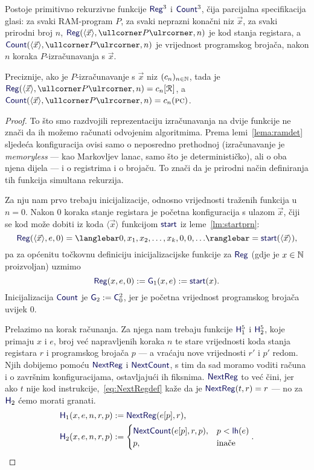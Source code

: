 \begin{lema}[{name=[primitivna rekurzivnost RAM-izračunavanja]}]\label{lm:RegCountprn}
Postoje primitivno rekurzivne funkcije $\f{Reg}^3$ i $\f{Count}^3$, čija parcijalna specifikacija glasi:
za svaki RAM-program $P$, za svaki neprazni konačni niz $\vec x$, za svaki prirodni broj $n$, $\f{Reg}(\langle \vec x\rangle,\kprog{P},n)$ je kod stanja registara, a $\f{Count}(\langle \vec x\rangle,\kprog{P},n)$ je vrijednost programskog brojača, nakon $n$ koraka $P$-izračunavanja s $\vec x$.
\end{lema}
Preciznije, ako je $P$-izračunavanje s $\vec x$ niz $(c_n)_{n\in{\mathbb N}}$, tada je $\f{Reg}(\langle\vec x\rangle, \kprog{P},n)=c_n[\reg{}]$, a $\f{Count}(\langle\vec x\rangle,\kprog{P},n)=c_n(\textsc{pc})$.
\begin{proof}
    To što smo razdvojili reprezentaciju izračunavanja na dvije funkcije ne znači da ih možemo računati odvojenim algoritmima. Prema lemi~\ref{lema:ramdet} sljedeća konfiguracija ovisi samo o neposredno prethodnoj (izračunavanje je \emph{memoryless} --- kao Markovljev lanac, samo što je determinističko), ali o oba njena dijela --- i o registrima i o brojaču. To znači da je prirodni način definiranja tih funkcija simultana rekurzija.

Za nju nam prvo trebaju inicijalizacije, odnosno vrijednosti traženih funkcija u $n=0$. Nakon $0$ koraka stanje registara je početna konfiguracija s ulazom $\vec x$, čiji se kod može dobiti iz koda $\langle\vec x\rangle$ funkcijom $\f{start}$ iz leme~\ref{lm:startprn}:
\begin{equation}
    \f{Reg}(\langle\vec x\rangle,e,0)=\knk{0,x_1,x_2,\dotsc,x_k,0,0,\dotsc}=\f{start}(\langle\vec x\rangle)\text,
\end{equation}
pa za općenitu točkovnu definiciju inicijalizacijske funkcije za $\f{Reg}$ (gdje je $x\in{\mathbb N}$ proizvoljan) uzmimo
\begin{equation}
    \f{Reg}(x,e,0):=\f G_1(x,e):=\f{start}(x)\text.
\end{equation}
Inicijalizacija $\f{Count}$ je $\f G_2:=\f C_0^2$, jer je početna vrijednost programskog brojača uvijek $0$.

Prelazimo na korak računanja. Za njega nam trebaju funkcije $\f H_1^5$ i $\f H_2^5$, koje primaju $x$ i $e$, broj već napravljenih koraka $n$ te stare vrijednosti koda stanja registara $r$ i programskog brojača $p$ --- a vraćaju nove vrijednosti $r'$ i $p'$ redom. Njih dobijemo pomoću $\f{NextReg}$ i $\f{NextCount}$, s tim da sad moramo voditi računa i o završnim konfiguracijama, ostavljajući ih fiksnima. $\f{NextReg}$ to već čini, jer ako $t$ nije kod instrukcije,~\eqref{eq:NextRegdef} kaže da je $\f{NextReg}(t,r)=r$ --- no za $\f H_2$ ćemo morati granati.
\begin{align}
    \f H_1(x,e,n,r,p)&:=\f{NextReg}(e[p],r)\text,\\
    \f H_2(x,e,n,r,p)&:=\begin{cases}
        \f{NextCount}(e[p],r,p),&
        p<\f{lh}(e)\\
        p,&\text{inače}
    \end{cases}\text.
\end{align}


\end{proof}
